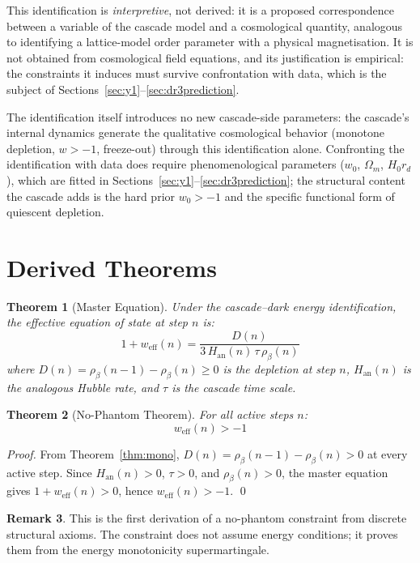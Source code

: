 \documentclass[12pt,a4paper]{article}
\theoremstyle{plain}
\newtheorem{theorem}{Theorem}[section]
\theoremstyle{definition}
\newtheorem{remark}[theorem]{Remark}
\newcommand{\rhob}{\rho_{\beta}}
\newcommand{\weff}{w_{\mathrm{eff}}}
\begin{document}
This identification is \emph{interpretive}, not derived: it is a proposed
correspondence between a variable of the cascade model and a cosmological
quantity, analogous to identifying a lattice-model order parameter with a
physical magnetisation. It is not obtained from cosmological field equations,
and its justification is empirical: the constraints it induces must survive
confrontation with data, which is the subject of
Sections~\ref{sec:y1}--\ref{sec:dr3prediction}.

The identification itself introduces no new cascade-side parameters: the
cascade's internal dynamics generate the qualitative cosmological behavior
(monotone depletion, $w > -1$, freeze-out) through this identification alone.
Confronting the identification with data does require phenomenological
parameters ($w_0$, $\Omega_m$, $H_0 r_d$), which are fitted in
Sections~\ref{sec:y1}--\ref{sec:dr3prediction}; the structural content the
cascade adds is the hard prior $w_0 > -1$ and the specific functional form of
quiescent depletion.

\section{Derived Theorems}
\label{sec:theorems}

\begin{theorem}[Master Equation]
Under the cascade--dark energy identification, the effective equation of state at
step $n$ is:
\[
1 + \weff(n) = \frac{D(n)}{3\,H_{\mathrm{an}}(n)\,\tau\,\rhob(n)}
\]
where $D(n) = \rhob(n-1) - \rhob(n) \geq 0$ is the depletion at step $n$,
$H_{\mathrm{an}}(n)$ is the analogous Hubble rate, and $\tau$ is the cascade
time scale.
\end{theorem}

\begin{theorem}[No-Phantom Theorem]\label{thm:nophantom}
For all active steps $n$:
\[
\weff(n) > -1
\]
\end{theorem}

\begin{proof}
From Theorem~\ref{thm:mono}, $D(n) = \rhob(n-1) - \rhob(n) > 0$ at every active
step. Since $H_{\mathrm{an}}(n) > 0$, $\tau > 0$, and $\rhob(n) > 0$, the master
equation gives $1 + \weff(n) > 0$, hence $\weff(n) > -1$. \qed
\end{proof}

\begin{remark}
This is the first derivation of a no-phantom constraint from discrete structural
axioms. The constraint does not assume energy conditions; it proves them from the
energy monotonicity supermartingale.
\end{remark}
\end{document}
